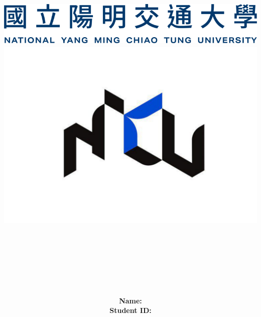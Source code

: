 \documentclass[12pt,a4paper]{report}
\title{
	\includegraphics[scale=0.7]{img/nycu_name.png}\\
	\includegraphics[scale=0.5]{img/nycu_logo.pdf}\\
	~\\
	\LARGE\textbf{\reportSubtitle}\\
	\huge\textbf{\reportTitle}\\
}
\author{
	\begin{tabular}{rl}
		\textbf{Name: } & \authorName \\
		\textbf{Student ID: } & \authorStudentID  \\
	\end{tabular} \\~\\
	\authorDepartment
}
\begin{document}
	\maketitle
	\tableofcontents
	
%	
	
	
	\begin{appendices}
		
	\end{appendices}
\end{document}
